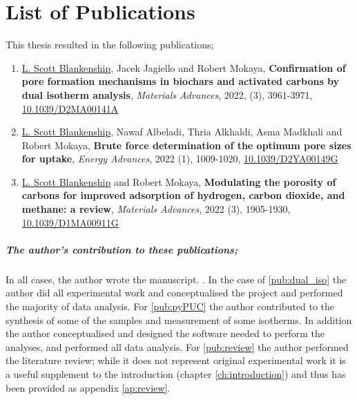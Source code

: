 \cleardoublepage

\chapter*{List of Publications}

This thesis resulted in the following publications;

\begin{enumerate}[label=\Roman*, ref={\textbf{Publication \Roman*}}]
    \item \underline{L. Scott Blankenship}, Jacek Jagiello and Robert Mokaya, \textbf{Confirmation of pore formation mechanisms in biochars and activated carbons by dual isotherm analysis}, \textit{Materials Advances}, 2022, (3), 3961-3971, \href{https://doi.org/10.1039/D2MA00141A}{10.1039/D2MA00141A}
    \label{pub:dual_iso}
    \item \underline{L. Scott Blankenship}, Nawaf Albeladi, Thria Alkhaldi, Asma Madkhali and Robert Mokaya, \textbf{Brute force determination of the optimum pore sizes for  uptake}, \textit{Energy Advances}, 2022 (1), 1009-1020, \href{https://doi.org/10.1039/D2YA00149G}{10.1039/D2YA00149G}
    \label{pub:pyPUC}
    \item \underline{L. Scott Blankenship} and Robert Mokaya, \textbf{Modulating the porosity of carbons for improved adsorption of hydrogen, carbon dioxide, and methane: a review}, \textit{Materials Advances}, 2022 (3), 1905-1930, \href{https://doi.org/10.1039/D1MA00911G}{10.1039/D1MA00911G}
    \label{pub:review}
\end{enumerate}

\paragraph{The author's contribution to these publications;}
In all cases, the author wrote the manuscript. . In the case of \ref{pub:dual_iso} the author did all experimental work and conceptualised the project and performed the majority of data analysis. For \ref{pub:pyPUC} the author contributed to the synthesis of some of the samples and measurement of some isotherms. In addition the author conceptualised and designed the software needed to perform the analyses, and performed all data analysis. For \ref{pub:review} the author performed the literature review; while it does not represent original experimental work it is a useful supplement to the introduction (chapter \ref{ch:introduction}) and thus has been provided as appendix \ref{ap:review}.

